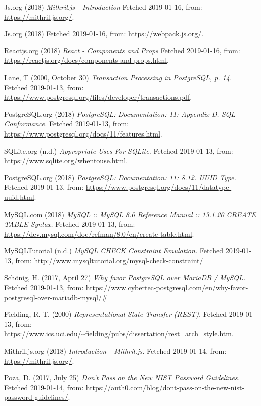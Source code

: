\documentclass[12pt,a4paper]{report}
\begin{document}
{\begin{thebibliography}{1}
Js.org (2018) {\em Mithril.js - Introduction} Fetched 2019-01-16, from: \url{https://mithril.js.org/}.

Js.org (2018) Fetched 2019-01-16, from: \url{https://webpack.js.org/}.

Reactjs.org (2018) {\em React - Components and Props} Fetched 2019-01-16, from: \url{https://reactjs.org/docs/components-and-props.html}.

Lane, T (2000, October 30) {\em Transaction Processing in PostgreSQL, p. 14.} Fetched 2019-01-13, from: \url{https://www.postgresql.org/files/developer/transactions.pdf}.

PostgreSQL.org (2018) {\em PostgreSQL: Documentation: 11: Appendix D. SQL Conformance.} Fetched 2019-01-13, from: \url{https://www.postgresql.org/docs/11/features.html}.

SQLite.org (n.d.) {\em Appropriate Uses For SQLite.} Fetched 2019-01-13, from: \url{https://www.sqlite.org/whentouse.html}.

PostgreSQL.org (2018) {\em PostgreSQL: Documentation: 11: 8.12. UUID Type.} Fetched 2019-01-13, from: \url{https://www.postgresql.org/docs/11/datatype-uuid.html}.

MySQL.com (2018) {\em MySQL :: MySQL 8.0 Reference Manual :: 13.1.20 CREATE TABLE Syntax.} Fetched 2019-01-13, from: \url{https://dev.mysql.com/doc/refman/8.0/en/create-table.html}.

MySQLTutorial (n.d.) {\em MySQL CHECK Constraint Emulation.} Fetched 2019-01-13, from: \url{http://www.mysqltutorial.org/mysql-check-constraint/}

Schönig, H. (2017, April 27) {\em Why favor PostgreSQL over MariaDB / MySQL.} Fetched 2019-01-13, from:  \url{https://www.cybertec-postgresql.com/en/why-favor-postgresql-over-mariadb-mysql/#}

 Fielding, R. T. (2000) {\em Representational State Transfer (REST).} Fetched 2019-01-13, from: \url{https://www.ics.uci.edu/~fielding/pubs/dissertation/rest_arch_style.htm}.

 Mithril.js.org (2018) {\em Introduction - Mithril.js.} Fetched 2019-01-14, from: \url{https://mithril.js.org/}.

 Poza, D. (2017, July 25) {\em Don't Pass on the New NIST Password Guidelines.} Fetched 2019-01-14, from: \url{https://auth0.com/blog/dont-pass-on-the-new-nist-password-guidelines/}.


\end{thebibliography}}
\end{document}
